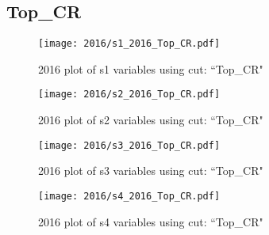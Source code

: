 \documentclass{article}
\begin{document}
      \subsection*{Top\_CR}
                        \begin{figure}[H]
                            \centering
                            \caption{2016 plot of s1 variables using cut: ``Top\_CR"}
                            \texttt{[image: 2016/s1\_2016\_Top\_CR.pdf]}
                        \end{figure}    
                        \begin{figure}[H]
                            \centering
                            \caption{2016 plot of s2 variables using cut: ``Top\_CR"}
                            \texttt{[image: 2016/s2\_2016\_Top\_CR.pdf]}
                        \end{figure}    
                        \begin{figure}[H]
                            \centering
                            \caption{2016 plot of s3 variables using cut: ``Top\_CR"}
                            \texttt{[image: 2016/s3\_2016\_Top\_CR.pdf]}
                        \end{figure}    
                        \begin{figure}[H]
                            \centering
                            \caption{2016 plot of s4 variables using cut: ``Top\_CR"}
                            \texttt{[image: 2016/s4\_2016\_Top\_CR.pdf]}
                        \end{figure}    
\end{document}

